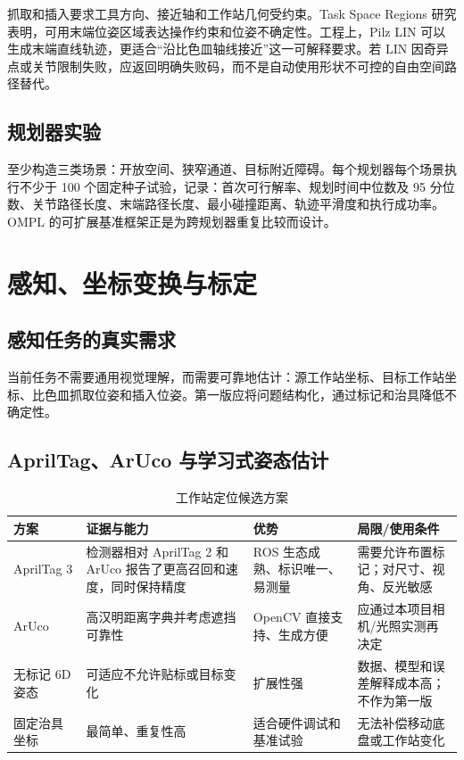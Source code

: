 \documentclass[UTF8,12pt,oneside]{ctexrep}
\begin{document}
抓取和插入要求工具方向、接近轴和工作站几何受约束。Task Space Regions 研究表明，可用末端位姿区域表达操作约束和位姿不确定性\cite{berenson2011tsr}。工程上，Pilz LIN 可以生成末端直线轨迹\cite{moveitpilz2026}，更适合“沿比色皿轴线接近”这一可解释要求。若 LIN 因奇异点或关节限制失败，应返回明确失败码，而不是自动使用形状不可控的自由空间路径替代。

\section{规划器实验}

至少构造三类场景：开放空间、狭窄通道、目标附近障碍。每个规划器每个场景执行不少于 100 个固定种子试验，记录：首次可行解率、规划时间中位数及 95 分位数、关节路径长度、末端路径长度、最小碰撞距离、轨迹平滑度和执行成功率。OMPL 的可扩展基准框架正是为跨规划器重复比较而设计\cite{moll2015benchmarking}。

\chapter{感知、坐标变换与标定}

\section{感知任务的真实需求}

当前任务不需要通用视觉理解，而需要可靠地估计：源工作站坐标、目标工作站坐标、比色皿抓取位姿和插入位姿。第一版应将问题结构化，通过标记和治具降低不确定性。

\section{AprilTag、ArUco 与学习式姿态估计}

\begin{table}[H]
\centering
\caption{工作站定位候选方案}
\begin{tabularx}{\textwidth}{L{2.5cm}YYY}
\toprule
方案 & 证据与能力 & 优势 & 局限/使用条件 \\
\midrule
AprilTag 3 & 检测器相对 AprilTag 2 和 ArUco 报告了更高召回和速度，同时保持精度\cite{krogius2019apriltag3} & ROS 生态成熟、标识唯一、易测量 & 需要允许布置标记；对尺寸、视角、反光敏感 \\
ArUco & 高汉明距离字典并考虑遮挡可靠性\cite{garrido2014aruco} & OpenCV 直接支持、生成方便 & 应通过本项目相机/光照实测再决定 \\
无标记 6D 姿态 & 可适应不允许贴标或目标变化 & 扩展性强 & 数据、模型和误差解释成本高；不作为第一版 \\
固定治具坐标 & 最简单、重复性高 & 适合硬件调试和基准试验 & 无法补偿移动底盘或工作站变化 \\
\bottomrule
\end{tabularx}
\end{table}
\end{document}
